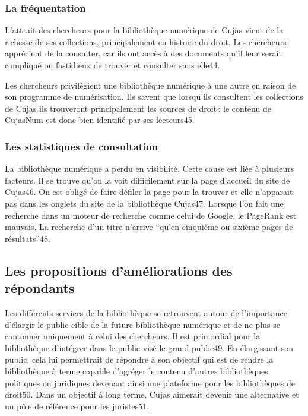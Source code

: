 \subsubsection{La fréquentation}

L’attrait des chercheurs pour la bibliothèque numérique de Cujas vient de la richesse de ses collections, principalement en histoire du droit. Les chercheurs apprécient de la consulter, car ils ont accès à des documents qu’il leur serait compliqué ou fastidieux de trouver et consulter sans elle44. 

Les chercheurs privilégient une bibliothèque numérique à une autre en raison de son programme de numérisation. Ils savent que lorsqu’ils consultent les collections de Cujas ils trouveront principalement les sources de droit : le contenu de CujasNum est donc bien identifié par ses lecteurs45.  

\subsubsection{Les statistiques de consultation}

La bibliothèque numérique a perdu en visibilité. Cette cause est liée à plusieurs facteurs. Il se trouve qu’on la voit difficilement sur la page d’accueil du site de Cujas46. On est obligé de faire défiler la page pour la trouver et elle n’apparait pas dans les onglets du site de la bibliothèque Cujas47. Lorsque l’on fait une recherche dans un moteur de recherche comme celui de Google, le PageRank est mauvais. La recherche d’un titre n’arrive \enquote{qu’en cinquième ou sixième pages de résultats}48.  

\subsection{Les propositions d’améliorations des répondants}

Les différents services de la bibliothèque se retrouvent autour de l’importance d’élargir le public cible de la future bibliothèque numérique et de ne plus se cantonner uniquement à celui des chercheurs. Il est primordial pour la bibliothèque d’intégrer dans le public visé le grand public49. En élargissant son public, cela lui permettrait de répondre à son objectif qui est de rendre la bibliothèque à terme capable d’agréger le contenu d’autres bibliothèques politiques ou juridiques devenant ainsi une plateforme pour les bibliothèques de droit50. Dans un objectif à long terme, Cujas aimerait devenir une alternative et un pôle de référence pour les juristes51.  

